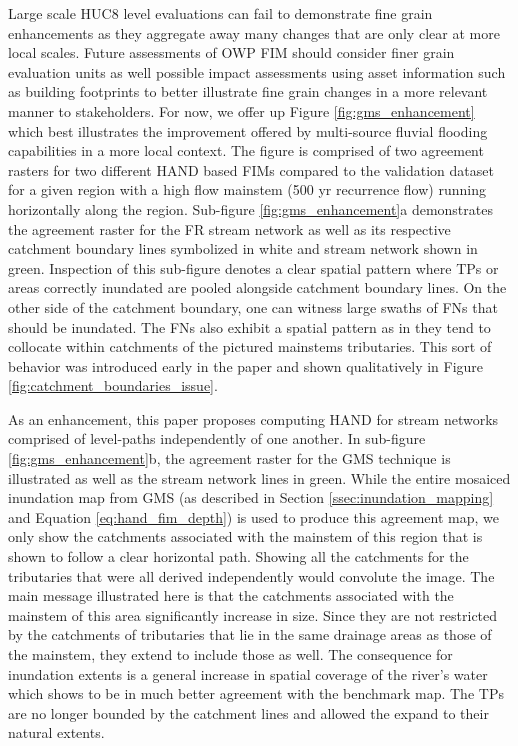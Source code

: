\documentclass[draft]{dependencies/agujournal2019}
\begin{document}
Large scale HUC8 level evaluations can fail to demonstrate fine grain enhancements as they aggregate away many changes that are only clear at more local scales.
Future assessments of OWP FIM should consider finer grain evaluation units as well possible impact assessments using asset information such as building footprints to better illustrate fine grain changes in a more relevant manner to stakeholders.
For now, we offer up Figure \ref{fig:gms_enhancement} which best illustrates the improvement offered by multi-source fluvial flooding capabilities in a more local context.
The figure is comprised of two agreement rasters for two different HAND based FIMs compared to the validation dataset for a given region with a high flow mainstem (500 yr recurrence flow) running horizontally along the region.
Sub-figure \ref{fig:gms_enhancement}a demonstrates the agreement raster for the FR stream network as well as its respective catchment boundary lines symbolized in white and stream network shown in green.
Inspection of this sub-figure denotes a clear spatial pattern where TPs or areas correctly inundated are pooled alongside catchment boundary lines. 
On the other side of the catchment boundary, one can witness large swaths of FNs that should be inundated. 
The FNs also exhibit a spatial pattern as in they tend to collocate within catchments of the pictured mainstems tributaries.
This sort of behavior was introduced early in the paper and shown qualitatively in Figure \ref{fig:catchment_boundaries_issue}.

As an enhancement, this paper proposes computing HAND for stream networks comprised of level-paths independently of one another.
In sub-figure \ref{fig:gms_enhancement}b, the agreement raster for the GMS technique is illustrated as well as the stream network lines in green.
While the entire mosaiced inundation map from GMS (as described in Section \ref{ssec:inundation_mapping} and Equation \ref{eq:hand_fim_depth}) is used to produce this agreement map, we only show the catchments associated with the mainstem of this region that is shown to follow a clear horizontal path.
Showing all the catchments for the tributaries that were all derived independently would convolute the image.
The main message illustrated here is that the catchments associated with the mainstem of this area significantly increase in size.
Since they are not restricted by the catchments of tributaries that lie in the same drainage areas as those of the mainstem, they extend to include those as well.
The consequence for inundation extents is a general increase in spatial coverage of the river's water which shows to be in much better agreement with the benchmark map.
The TPs are no longer bounded by the catchment lines and allowed the expand to their natural extents.
\end{document}
